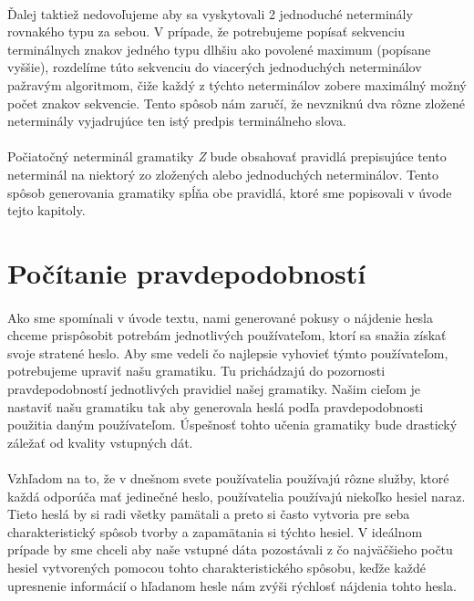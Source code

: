 \paragraph{}
Ďalej taktiež nedovoľujeme aby sa vyskytovali 2 jednoduché neterminály rovnakého typu za sebou. V prípade, že potrebujeme popísať sekvenciu terminálnych znakov jedného typu dlhšiu ako povolené maximum (popísane vyššie), rozdelíme túto sekvenciu do viacerých jednoduchých neterminálov pažravým algoritmom, čiže každý z týchto neterminálov zobere maximálný možný počet znakov sekvencie. Tento spôsob nám zaručí, že nevzniknú dva rôzne zložené neterminály vyjadrujúce ten istý predpis terminálneho slova.
\paragraph{}
Počiatočný neterminál gramatiky \emph{Z} bude obsahovať pravidlá prepisujúce tento neterminál na niektorý zo zložených alebo jednoduchých neterminálov. Tento spôsob generovania gramatiky spĺňa obe pravidlá, ktoré sme popisovali v úvode tejto kapitoly. 

\section{Počítanie pravdepodobností}
\paragraph{}
Ako sme spomínali v úvode textu, nami generované pokusy o nájdenie hesla chceme prispôsobit potrebám jednotlivých používateľom, ktorí sa snažia získať svoje stratené heslo. Aby sme vedeli čo najlepsie vyhovieť týmto používateľom, potrebujeme upraviť našu gramatiku. Tu prichádzajú do pozornosti pravdepodobností jednotlivých pravidiel našej gramatiky. Našim cieľom je nastaviť našu gramatiku tak aby generovala heslá podľa pravdepodobnosti použitia daným používateľom. Úspešnosť tohto učenia gramatiky bude drastický záležať od kvality vstupných dát.
\paragraph{}
Vzhľadom na to, že v dnešnom svete používatelia používajú rôzne služby, ktoré každá odporúča mať jedinečné heslo, používatelia používajú niekoľko hesiel naraz. Tieto heslá by si radi všetky pamätali a preto si často vytvoria pre seba charakteristický spôsob tvorby a zapamätania si týchto hesiel. V ideálnom prípade by sme chceli aby naše vstupné dáta pozostávali z čo najväčšieho počtu hesiel vytvorených pomocou tohto charakteristického spôsobu, keďže každé upresnenie informácií o hľadanom hesle nám zvýši rýchlosť nájdenia tohto hesla.
